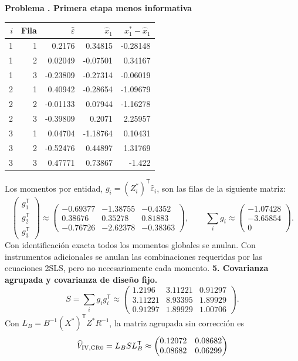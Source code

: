 \documentclass[11pt,a4paper]{article}
\newcommand{\T}{^{\mathsf T}}
\theoremstyle{definition}
\newcounter{problema}
\newenvironment{resuelto}[1]{\refstepcounter{problema}\par\medskip\Needspace{6\baselineskip}\textbf{Problema \theproblema. #1}\par}{\par\medskip}
\newcommand{\eps}{\varepsilon}
\begin{document}
\begin{resuelto}{Primera etapa menos informativa}
\begin{center}\small
\begin{tabular}{rrrrr}
\toprule
$i$&Fila&$\widehat\eps$&$\widehat x_1$&$x_1^*-\widehat x_1$\\
\midrule
1&1&0.2176&0.34815&-0.28148\\
1&2&0.02049&-0.07501&0.34167\\
1&3&-0.23809&-0.27314&-0.06019\\
2&1&0.40942&-0.28654&-1.09679\\
2&2&-0.01133&0.07944&-1.16278\\
2&3&-0.39809&0.2071&2.25957\\
3&1&0.04704&-1.18764&0.10431\\
3&2&-0.52476&0.44897&1.31769\\
3&3&0.47771&0.73867&-1.422\\
\bottomrule
\end{tabular}
\end{center}
Los momentos por entidad, $g_i=(Z_i^*)\T\widehat\eps_i$, son las filas de la siguiente matriz:
\[
\begin{pmatrix}g_1\T\\g_2\T\\g_3\T\end{pmatrix}\approx\begin{pmatrix}
-0.69377&-1.38755&-0.4352\\0.38676&0.35278&0.81883\\-0.76726&-2.62378&-0.38363
\end{pmatrix},\qquad \sum_i g_i\approx\begin{pmatrix}
-1.07428\\-3.65854\\0
\end{pmatrix}.
\]
Con identificación exacta todos los momentos globales se anulan. Con instrumentos adicionales se anulan las combinaciones requeridas por las ecuaciones 2SLS, pero no necesariamente cada momento.
\textbf{5. Covarianza agrupada y covarianza de diseño fijo.}
\[
S=\sum_i g_ig_i\T\approx\begin{pmatrix}
1.2196&3.11221&0.91297\\3.11221&8.93395&1.89929\\0.91297&1.89929&1.00706
\end{pmatrix}.
\]
Con $L_B=B^{-1}(X^*)\T Z^*R^{-1}$, la matriz agrupada sin corrección es
\[
\widehat V_{\rm IV,CR0}=L_BSL_B\T\approx\begin{pmatrix}
0.12072&0.08682\\0.08682&0.06299

\end{pmatrix}\]
\end{resuelto}
\end{document}
